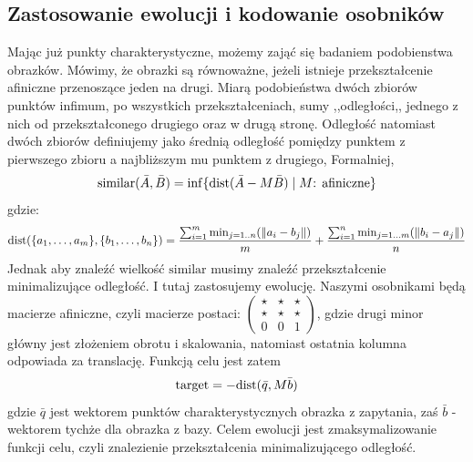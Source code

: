 \documentclass[a4paper,12pt,leqno]{article}
\begin{document}
\subsection{Zastosowanie ewolucji i kodowanie osobników}
Mając już punkty charakterystyczne, możemy zająć się badaniem podobienstwa obrazków. Mówimy, że obrazki są równoważne, jeżeli istnieje przekształcenie afiniczne 
przenoszące jeden na drugi. Miarą podobieństwa dwóch zbiorów punktów infimum, po wszystkich przekształceniach,
sumy ,,odległości,, jednego z nich od przekształconego drugiego oraz w drugą stronę. 
Odległość natomiast dwóch zbiorów definiujemy jako średnią odległość pomiędzy punktem z pierwszego zbioru a najbliższym mu punktem z drugiego, Formalniej,
\[
\mathrm{similar}(\bar{A}, \bar{B}) = \inf\{\textrm{dist}(\bar{A} - M\bar{B}) \;\arrowvert\; M\text{: afiniczne}\}
\]gdzie:
\[
\mathrm{dist}(\{a_1, \dots, a_m\}, \{b_1, \dots, b_n\}) = \frac{\sum_{i=1}^m \min_{j=1..n}(\|a_i - b_j\|)}{m} + \frac{\sum_{i=1}^n \min_{j=1 \dots m}(\|b_i - a_j\|)}{n}
\]
Jednak aby znaleźć wielkość $\mathrm{similar}$ musimy znaleźć przekształcenie minimalizujące odległość. I tutaj zastosujemy ewolucję. 
Naszymi osobnikami będą macierze afiniczne, czyli macierze postaci:
$\begin{pmatrix}
\star & \star & \star \\
\star & \star & \star \\
0 & 0 & 1
\end{pmatrix}$, gdzie drugi minor główny jest złożeniem obrotu i skalowania, natomiast ostatnia kolumna odpowiada za translację.
Funkcją celu jest zatem 
\[
\mathrm{target} = -\mathrm{dist}(\bar{q}, M\bar{b})
\]
gdzie $\bar{q}$ jest wektorem punktów charakterystycznych obrazka z zapytania, zaś $\bar{b}$ - wektorem tychże dla obrazka z bazy.
Celem ewolucji jest zmaksymalizowanie funkcji celu, czyli znalezienie przekształcenia minimalizującego odległość.
\end{document}
